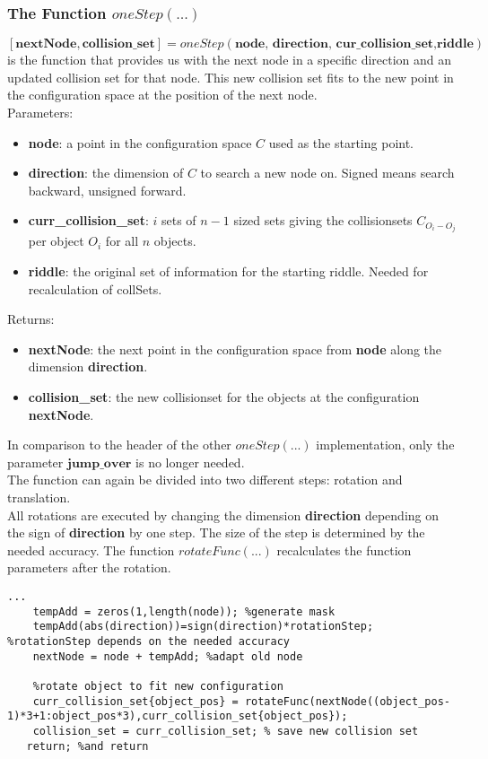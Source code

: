 \subsubsection{The Function $oneStep(...)$}
$[\textbf{nextNode}, \textbf{collision\_set} ]=oneStep(\textbf{node, direction, cur\_collision\_set,riddle})$ is the function that provides us with the next node in a specific direction and an updated collision set for that node. This new collision set fits to the new point in the configuration space at the position of the next node.\\
Parameters:
\begin{itemize}
\item \textbf{node}: a point in the configuration space $C$ used as the starting point.
\item \textbf{direction}: the dimension of $C$ to search a new node on. Signed means search backward, unsigned forward. 
\item \textbf{curr\_collision\_set}: $i$ sets of $n-1$ sized sets giving the collisionsets $C_{O_i-O_j}$ per object $O_i$ for all $n$ objects.
\item \textbf{riddle}: the original set of information for the starting riddle. Needed for recalculation of collSets.
\end{itemize}
Returns:
\begin{itemize}
\item \textbf{nextNode}: the next point in the configuration space from \textbf{node} along the dimension \textbf{direction}.
\item \textbf{collision\_set}: the new collisionset for the objects at the configuration \textbf{nextNode}.
\end{itemize}
In comparison to the header of the other $oneStep(...)$ implementation, only the parameter $\textbf{jump\_over}$ is no longer needed.\\
The function can again be divided into two different steps: rotation and translation.\\
All rotations are executed by changing the dimension \textbf{direction}  depending on the sign of \textbf{direction} by one step. The size of the step is determined 
by the needed accuracy. The function $rotateFunc(...)$ recalculates the function parameters after the rotation. \\
\begin{lstlisting}
...
    tempAdd = zeros(1,length(node)); %generate mask
    tempAdd(abs(direction))=sign(direction)*rotationStep; %rotationStep depends on the needed accuracy
    nextNode = node + tempAdd; %adapt old node
    
    %rotate object to fit new configuration
    curr_collision_set{object_pos} = rotateFunc(nextNode((object_pos-1)*3+1:object_pos*3),curr_collision_set{object_pos}); 
    collision_set = curr_collision_set; % save new collision set
   return; %and return
\end{lstlisting}
